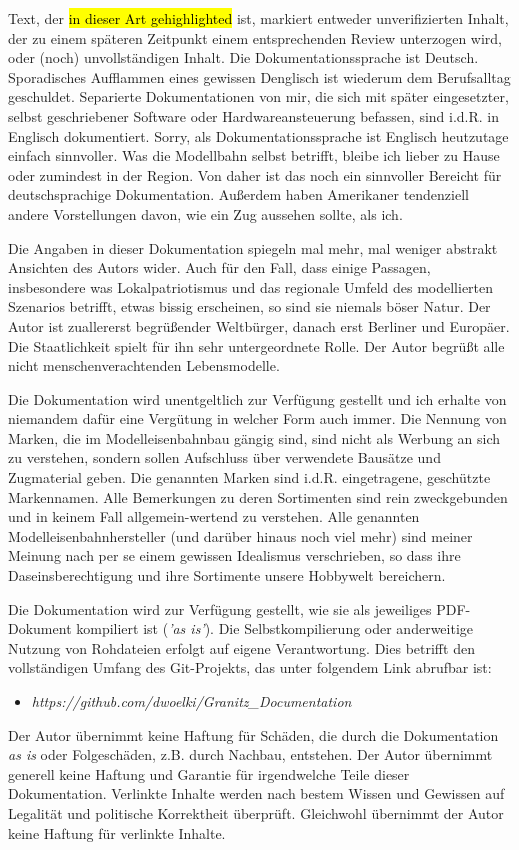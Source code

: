 {	Text, der \hl{in dieser Art gehighlighted} ist, markiert entweder unverifizierten Inhalt, der zu einem sp\"ateren Zeitpunkt einem entsprechenden Review unterzogen wird, oder (noch) unvollst\"andigen Inhalt.
	Die Dokumentationssprache ist Deutsch.
	Sporadisches Aufflammen eines gewissen Denglisch ist wiederum dem Berufsalltag geschuldet.
	Separierte Dokumentationen von mir, die sich mit sp\"ater eingesetzter, selbst geschriebener Software oder Hardwareansteuerung befassen, sind i.d.R. in Englisch dokumentiert.
	Sorry, als Dokumentationssprache ist Englisch heutzutage einfach sinnvoller.
	Was die Modellbahn selbst betrifft, bleibe ich lieber zu Hause oder zumindest in der Region.
	Von daher ist das noch ein sinnvoller Bereicht f\"ur deutschsprachige Dokumentation.
	Au{\ss}erdem haben Amerikaner tendenziell andere Vorstellungen davon, wie ein Zug aussehen sollte, als ich.
	
	Die Angaben in dieser Dokumentation spiegeln mal mehr, mal weniger abstrakt Ansichten des Autors wider.
	Auch f\"ur den Fall, dass einige Passagen, insbesondere was Lokalpatriotismus und das regionale Umfeld des modellierten Szenarios betrifft, etwas bissig erscheinen, so sind sie niemals b\"oser Natur.
	Der Autor ist zuallererst begr\"u{\ss}ender Weltb\"urger, danach erst Berliner und Europ\"aer.
	Die Staatlichkeit spielt f\"ur ihn sehr untergeordnete Rolle.
	Der Autor begr\"u{\ss}t alle nicht menschenverachtenden Lebensmodelle.
	
	Die Dokumentation wird unentgeltlich zur Verf\"ugung gestellt und ich erhalte von niemandem daf\"ur eine Verg\"utung in welcher Form auch immer.
	Die Nennung von Marken, die im Modelleisenbahnbau g\"angig sind, sind nicht als Werbung an sich zu verstehen, sondern sollen Aufschluss \"uber verwendete Baus\"atze und Zugmaterial geben.
	Die genannten Marken sind i.d.R. eingetragene, gesch\"utzte Markennamen.
	Alle Bemerkungen zu deren Sortimenten sind rein zweckgebunden und in keinem Fall allgemein-wertend zu verstehen.
	Alle genannten Modelleisenbahnhersteller (und dar\"uber hinaus noch viel mehr) sind meiner Meinung nach per se einem gewissen Idealismus verschrieben, so dass ihre Daseinsberechtigung und ihre Sortimente unsere Hobbywelt bereichern.
	
	Die Dokumentation wird zur Verf\"ugung gestellt, wie sie als jeweiliges PDF-Dokument kompiliert ist (\textit{'as is'}).
	Die Selbstkompilierung oder anderweitige Nutzung von Rohdateien erfolgt auf eigene Verantwortung.
	Dies betrifft den vollst\"andigen Umfang des Git-Projekts, das unter folgendem Link abrufbar ist:
	\begin{itemize}
		\item[] \textit{https://github.com/dwoelki/Granitz\_Documentation}
	\end{itemize}
	Der Autor \"ubernimmt keine Haftung f\"ur Sch\"aden, die durch die Dokumentation \textit{as is} oder Folgesch\"aden, z.B. durch Nachbau, entstehen.
	Der Autor \"ubernimmt generell keine Haftung und Garantie f\"ur irgendwelche Teile dieser Dokumentation.
	Verlinkte Inhalte werden nach bestem Wissen und Gewissen auf Legalit\"at und politische Korrektheit \"uberpr\"uft.
	Gleichwohl \"ubernimmt der Autor keine Haftung f\"ur verlinkte Inhalte.
	
}
